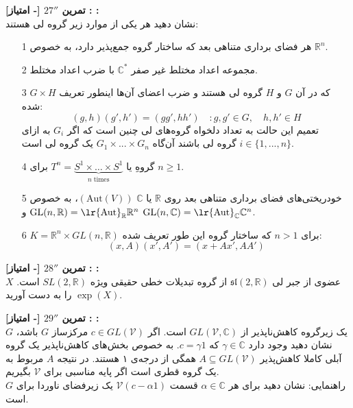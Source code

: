 \documentclass{article}
\newenvironment{exercise}[3][\unskip]{%
	\par
	\noindent
	\textbf{تمرین
		#1
		[- امتیاز] 
		\def\temp{#3}\ifx\temp\empty
		: 
		\else
		: #3 \vspace{0.5em} \\ \noindent
		\fi
}}{}
\begin{document}
	
	\begin{exercise}[$27''$]{20}{}
		نشان دهید هر یکی از موارد زیر گروه لی هستند: 
		\begin{enumerate}
			\item[1]
			هر فضای برداری متناهی بعد که ساختار گروه جمع‌پذیر
			دارد، به خصوص 
			$\mathbb{R}^n$. 
			\item[2]
			مجموعه اعداد مختلط غیر صفر 
			$\mathbb{C}^*$ 
			با ضرب اعداد مختلط.
			\item[3]
			$G \times H$ 
			که در آن 
			$G$ 
			و 
			$H$ 
			گروه لی هستند و ضرب اعضای آن‌ها اینطور تعریف شده: 
			\begin{equation*}
				(g,h)(g',h')=(gg',hh')\quad: g,g' \in G, \quad h,h' \in H
			\end{equation*}
			تعمیم این حالت به تعداد دلخواه گروه‌های لی چنین است که اگر 
			$G_i$ 
			به ازای 
			$i\in \{1,...,n\}$ 
			گروه لی باشند آن‌گاه 
			$G_1 \times ... \times G_n$
			یک گروه لی است.
			\item[4]
			گروهِ 
			یا
			$T^n = \underbrace{S^1 \times \dots \times S^1}_{ n \; \text{times}}$ 
			برای 
			$n \ge 1$. 
			\item[5]
			خودریختی‌های
			 فضای برداری متناهی بعد روی 
			$\mathbb{R}$ 
			یا 
			$\mathbb{C}$ 
			$(\text{Aut}(V))$، 
			به خصوص 
			$\text{GL}(n,\mathbb{R})=\text{\lr{Aut}}_{\mathbb{R}}\mathbb{R}^n$ 
			و 
			$\text{GL}(n,\mathbb{C})=\text{\lr{Aut}}_{\mathbb{C}}\mathbb{C}^n$.
			\item[6]
			$K=\mathbb{R}^n \times GL(n,\mathbb{R})$ 
			برای 
			$n>1$ 
			که ساختار گروه این طور تعریف شده:
			\begin{equation*}
				(x,A)(x',A')=(x+Ax', AA')
			\end{equation*}
		\end{enumerate}
	\end{exercise}
	
	
	\begin{exercise}[$28''$]{20}{}
		$X$ 
		عضوی از جبر لی 
		$\mathfrak{sl}(2,\mathbb{R})$ 
		از گروه تبدیلات خطی حقیقی ویژه  
		$SL(2,\mathbb{R})$ 
		است. 
		$\exp(X)$ 
		را به دست آورید.
	\end{exercise}
	
	\begin{exercise}[$29''$]{20}{}
		$G$ 
		یک زیرگروه کاهش‌‌ناپذیر از 
		$GL(\mathcal{V},\mathbb{C})$ 
		است. اگر 
		$c \in GL(\mathcal{V})$ 
		مرکزساز 
		$G$ 
		باشد، نشان دهید وجود دارد
		$\gamma \in \mathbb{C} $ 
		که 
		$c=\gamma 1$. 
		به خصوص  بخش‌های کاهش‌ناپذیر یک گروه آبلی کاملا کاهش‌پذیر 
		$A \subseteq GL(\mathcal{V})$ 
		همگی از درجه‌ی ۱ هستند. در نتیجه 
		$A$ 
		مربوط به یک گروه قطری است اگر پایه 
		مناسبی برای 
		$\mathcal{V}$ 
		بگیریم. \\
		\indent
		راهنمایی: نشان دهید برای هر 
		$\alpha \in \mathbb{C}$ 
		قسمت 
		$\mathcal{V}(c- \alpha 1)$ 
		یک زیرفضای ناوردا برای 
		$G$ 
		است.
	\end{exercise}
	
\end{document}
